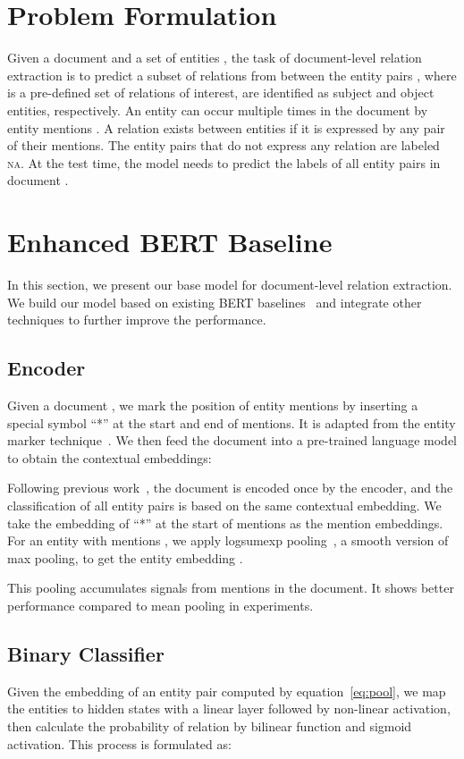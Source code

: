 \documentclass[letterpaper]{article}
\begin{document}
\section{Problem Formulation}
Given a document  and a set of entities , the task of document-level relation extraction is to predict a subset of relations from  between the entity pairs ,
where  is a pre-defined set of relations of interest,  are identified as subject and object entities, respectively.
An entity  can occur multiple times in the document by entity mentions .
A relation exists between entities  if it is expressed by any pair of their mentions.
The entity pairs that do not express any relation are labeled \textsc{na}.
At the test time, the model needs to predict the labels of all entity pairs  in document .

\section{Enhanced BERT Baseline}
In this section, we present our base model for document-level relation extraction.
We build our model based on existing BERT baselines~\cite{Yao2019DocREDAL,Wang2019FinetuneBF} and integrate other techniques to further improve the performance.
\subsection{Encoder}
Given a document , we mark the position of entity mentions by inserting a special symbol ``*'' at the start and end of mentions.
It is adapted from the entity marker technique~\cite{Zhang2017PositionawareAA,Shi2019SimpleBM,Soares2019MatchingTB}.
We then feed the document into a pre-trained language model to obtain the contextual embeddings:

Following previous work~\cite{Verga2018SimultaneouslyST,Wang2019ExtractingMI}, the document is encoded once by the encoder, and the classification of all entity pairs is based on the same contextual embedding.
We take the embedding of ``*'' at the start of mentions as the mention embeddings.
For an entity  with mentions , we apply logsumexp pooling~\cite{Jia2019DocumentLevelNR}, a smooth version of max pooling, to get the entity embedding .

This pooling accumulates signals from mentions in the document. It shows better performance compared to mean pooling in experiments.

\subsection{Binary Classifier}
Given the embedding  of an entity pair  computed by equation~\eqref{eq:pool}, we map the entities to hidden states  with a linear layer followed by non-linear activation, then calculate the probability of relation  by bilinear function and sigmoid activation. This process is formulated as:
\end{document}
